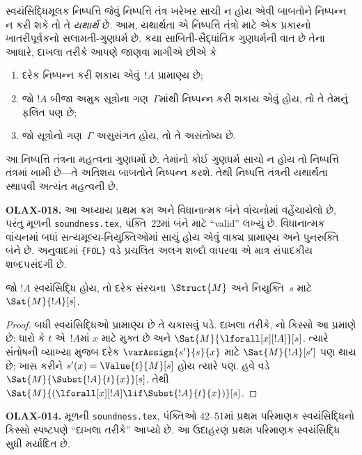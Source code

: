 \begin{explain}
સ્વયંસિદ્ધિમૂલક નિષ્પત્તિ જેવું નિષ્પત્તિ તંત્ર ખરેખર સાચી ન
હોય એવી બાબતોને નિષ્પન્ન ન કરી શકે તો તે \emph{યથાર્થ} છે. આમ,
યથાર્થતા એ નિષ્પત્તિ તંત્રો માટે એક પ્રકારનો ખાતરીપૂર્વકનો
સલામતી-ગુણધર્મ છે. કયા સાબિતી-સૈદ્ધાંતિક ગુણધર્મની વાત છે તેના આધારે,
દાખલા તરીકે આપણે જાણવા માગીએ છીએ કે
\begin{enumerate}
\item દરેક નિષ્પન્ન કરી શકાય એવું~$!A$ પ્રામાણ્ય છે;
\item જો $!A$ બીજા અમુક સૂત્રોના ગણ~$\Gamma$માંથી નિષ્પન્ન કરી શકાય એવું હોય,
  તો તે તેમનું ફલિત પણ છે;
\item જો સૂત્રોનો ગણ~$\Gamma$ અસુસંગત હોય, તો તે અસંતોષ્ય છે.
\end{enumerate}
આ નિષ્પત્તિ તંત્રના મહત્વના ગુણધર્મો છે. તેમાંનો કોઈ ગુણધર્મ
સાચો ન હોય તો નિષ્પત્તિ તંત્રમાં ખામી છે---તે અતિશય બાબતોને
નિષ્પન્ન કરશે. તેથી નિષ્પત્તિ તંત્રની યથાર્થતા સ્થાપવી અત્યંત
મહત્વની છે.
\end{explain}

\begin{editorial}
\textbf{OLAX-018.} આ અધ્યાય પ્રથમ ક્રમ અને વિધાનાત્મક બંને વાંચનોમાં વહેંચાયેલો છે, પરંતુ મૂળની \texttt{soundness.tex}, પંક્તિ~22માં બંને માટે “valid” લખ્યું છે. વિધાનાત્મક વાંચનમાં બધાં સત્યમૂલ્ય-નિયુક્તિઓમાં સાચું હોય એવું વાક્ય પ્રામાણ્ય અને પુનરુક્તિ બંને છે. અનુવાદમાં \texttt{\string\iftag\{FOL\}} વડે પ્રચલિત અલગ શબ્દો વાપરવા એ માત્ર સંપાદકીય શબ્દપસંદગી છે.
\end{editorial}

\begin{prop}
  જો $!A$ સ્વયંસિદ્ધિ હોય, તો
  દરેક સંરચના~$\Struct{M}$ અને નિયુક્તિ~$s$ માટે $\Sat{M}{!A}[s]$.
\end{prop}

\begin{proof}
બધી સ્વયંસિદ્ધિઓ પ્રામાણ્ય છે તે ચકાસવું પડે. દાખલા તરીકે,
  નો કિસ્સો આ પ્રમાણે છે: ધારો કે $t$ એ~$!A$માં
  $x$ માટે મુક્ત છે અને $\Sat{M}{\lforall[x][!A]}[s]$. ત્યારે
  સંતોષની વ્યાખ્યા મુજબ દરેક $\varAssign{s'}{s}{x}$ માટે
  $\Sat{M}{!A}[s']$ પણ થાય છે; ખાસ કરીને
  $s'(x) = \Value{t}{M}[s]$ હોય ત્યારે પણ. હવે
   વડે
  $\Sat{M}{\Subst{!A}{t}{x}}[s]$. તેથી
  $\Sat{M}{(\lforall[x][!A] \lif \Subst{!A}{t}{x})}[s]$.
\end{proof}

\begin{editorial}
\textbf{OLAX-014.} મૂળની \texttt{soundness.tex}, પંક્તિઓ 42--51માં પ્રથમ પરિમાણક સ્વયંસિદ્ધિનો કિસ્સો સ્પષ્ટપણે ``દાખલા તરીકે'' આપ્યો છે. આ ઉદાહરણ પ્રથમ પરિમાણક સ્વયંસિદ્ધિ સુધી મર્યાદિત છે.
\end{editorial}

